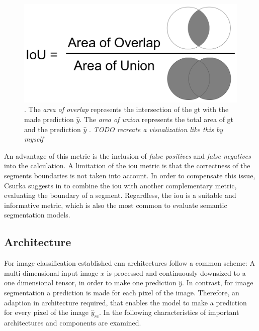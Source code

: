 \begin{figure}
	\includegraphics[scale=0.5]{figures/chap222_iou.png}
	\caption[Intersection over Union]{
		. The \textit{area of overlap} represents the intersection of the \gls{gt} with the made prediction $\hat{y}$. 
		The \textit{area of union} represents the total area of \gls{gt} and the prediction $\hat{y}$ \cite{Sha18-DLCV}. \textit{TODO recreate a visualization like this by myself}}
	\label{fig:ch2:sec2:iou}
\end{figure}

An advantage of this metric is the inclusion of \textit{false positives} and \textit{false negatives} into the calculation.
A limitation of the \gls{iou} metric is that the correctness of the segments boundaries is not taken into account. 
In order to compensate this issue, Csurka suggests in \cite{Csu13-EvalMetric} to combine the \gls{iou} with another complementary metric, evaluating the boundary of a segment.
Regardless, the \gls{iou} is a suitable and informative metric, which is also the most common to evaluate semantic segmentation models.



\subsection{Architecture}\label{ord:ch2:sec2:subsec3}
For image classification established \gls{cnn} architectures follow a common scheme: 
A multi dimensional input image $x$ is processed and continuously downsized to a one dimensional tensor, in order to make one prediction $\hat{y}$.
In contrast, for image segmentation a prediction is made for each pixel of the image.
Therefore, an adaption in architecture required, that enables the model to make a prediction for every pixel of the image $\hat{y}_{rc}$.
In the following characteristics of important architectures and components are examined.

